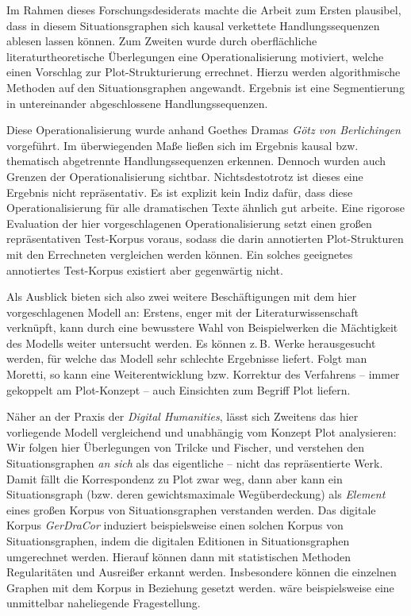 \documentclass[a4paper,10pt,abstract=true,headings=small]{scrartcl}
\newcommand{\eng}[1]{\textenglish{\emph{#1}}}
\begin{document}
Im Rahmen dieses Forschungsdesiderats machte die Arbeit zum Ersten plausibel, dass in diesem Situationsgraphen sich kausal verkettete Handlungssequenzen ablesen lassen können.
Zum Zweiten wurde durch oberflächliche literaturtheoretische Überlegungen eine Operationalisierung motiviert, welche einen Vorschlag zur Plot-Strukturierung errechnet.
Hierzu werden algorithmische Methoden auf den Situationsgraphen angewandt.
Ergebnis ist eine Segmentierung in untereinander abgeschlossene Handlungssequenzen.

Diese Operationalisierung wurde anhand Goethes Dramas \emph{Götz von Berlichingen} vorgeführt. Im überwiegenden Maße ließen sich im Ergebnis kausal bzw. thematisch abgetrennte Handlungssequenzen erkennen.
Dennoch wurden  auch Grenzen der Operationalisierung sichtbar.
Nichtsdestotrotz ist dieses eine  Ergebnis nicht repräsentativ.
Es ist explizit kein Indiz dafür, dass diese Operationalisierung für alle dramatischen Texte ähnlich gut arbeite.
Eine rigorose Evaluation der hier vorgeschlagenen Operationalisierung setzt einen großen repräsentativen Test-Korpus voraus,
sodass die darin annotierten  Plot-Strukturen mit den Errechneten vergleichen werden können.\autocite[Vgl.][608]{jannidis_computergestuetzte_2017}
Ein solches geeignetes annotiertes Test-Korpus existiert aber gegenwärtig nicht.

Als Ausblick bieten sich also zwei weitere Beschäftigungen mit dem hier vorgeschlagenen Modell an:
Erstens, enger mit der  Literaturwissenschaft verknüpft, kann durch eine bewusstere Wahl von Beispielwerken die Mächtigkeit des Modells weiter untersucht werden.
Es können z.\,B. Werke herausgesucht werden, für welche das Modell sehr schlechte Ergebnisse liefert.
Folgt man Moretti, so kann eine Weiterentwicklung bzw. Korrektur des Verfahrens – immer gekoppelt am Plot-Konzept – auch Einsichten zum Begriff Plot liefern.\autocites[Vgl.][13]{moretti_operationalizing:_2013}[Vgl.][]{trilcke_small_2020}

Näher an der Praxis der \eng{Digital Humanities}, lässt sich Zweitens das hier vorliegende Modell vergleichend und unabhängig vom Konzept Plot analysieren: %
Wir folgen hier Überlegungen von Trilcke und Fischer, und verstehen den Situationsgraphen \emph{an sich} als das eigentliche  – nicht das repräsentierte Werk.
Damit fällt die Korrespondenz zu Plot zwar weg, dann aber kann ein Situationsgraph (bzw. deren gewichtsmaximale Wegüberdeckung) als \emph{Element} eines großen Korpus von Situationsgraphen verstanden werden.\autocite[Vgl.][]{trilcke_literaturwissenschaft_2018}
Das digitale Korpus \emph{GerDraCor} induziert beispielsweise einen solchen Korpus von Situationsgraphen, indem die digitalen Editionen in Situationsgraphen umgerechnet werden.
Hierauf können dann mit statistischen Methoden Regularitäten und Ausreißer erkannt werden.
Insbesondere können die einzelnen Graphen mit dem Korpus in Beziehung gesetzt werden.
 wäre beispielsweise eine unmittelbar naheliegende Fragestellung.
\end{document}
